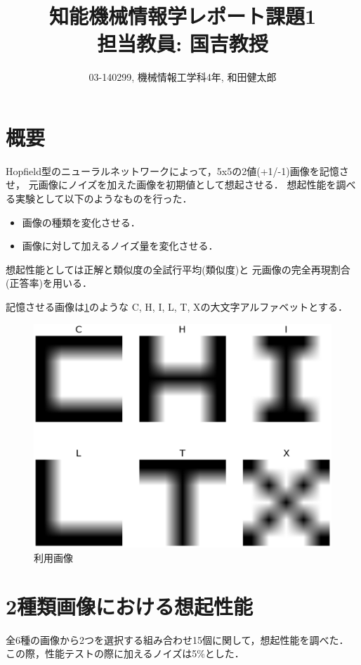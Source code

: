 \documentclass[10pt,twocolumn]{jarticle}
\title{知能機械情報学レポート課題1 \\ \large{担当教員: 国吉教授}}
\author{03-140299, 機械情報工学科4年, 和田健太郎}
\newcommand{\figref}[1]{\figurename\ref{fig:#1}}
\begin{document}
\maketitle


\section{概要}
Hopfield型のニューラルネットワーク\cite{Kuniyoshi:20150601}\cite{Youtube:HF}によって，5x5の2値(+1/-1)画像を記憶させ，
元画像にノイズを加えた画像を初期値として想起させる．
想起性能を調べる実験として以下のようなものを行った．
\begin{itemize}
  \item 画像の種類を変化させる．
  \item 画像に対して加えるノイズ量を変化させる．
\end{itemize}

想起性能としては正解と類似度の全試行平均(類似度)と
元画像の完全再現割合(正答率)を用いる．

記憶させる画像は\figref{original-images}のような
C, H, I, L, T, Xの大文字アルファベットとする．
\begin{figure}[htbp]
  \centering
    \includegraphics[width=\columnwidth]{figs/alphabet_images}
    \caption{利用画像}
  \label{fig:original-images}
\end{figure}


\section{2種類画像における想起性能}\label{sec:two-label-performance}
全6種の画像から2つを選択する組み合わせ15個に関して，想起性能を調べた．
この際，性能テストの際に加えるノイズは5\%とした．
\end{document}

